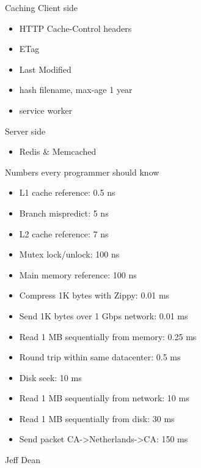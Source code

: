\documentclass{beamer}
\begin{document}
\begin{frame}{Caching}
  Client side
  \begin{itemize}
    \item HTTP Cache-Control headers
    \item ETag
    \item Last Modified
    \item hash filename, max-age 1 year
    \item service worker
  \end{itemize}
  Server side
  \begin{itemize}
    \item Redis \& Memcached
  \end{itemize}
\end{frame}

\begin{frame}{Numbers every programmer should know}
  \begin{itemize}
    \item L1 cache reference: 0.5 ns
    \item Branch mispredict: 5 ns
    \item L2 cache reference: 7 ns
    \item Mutex lock/unlock: 100 ns
    \item Main memory reference: 100 ns
    \item Compress 1K bytes with Zippy: 0.01 ms
    \item Send 1K bytes over 1 Gbps network: 0.01 ms
    \item Read 1 MB sequentially from memory: 0.25 ms
    \item Round trip within same datacenter: 0.5 ms
    \item Disk seek: 10 ms
    \item Read 1 MB sequentially from network: 10 ms
    \item Read 1 MB sequentially from disk: 30 ms
    \item Send packet CA->Netherlands->CA: 150 ms
  \end{itemize}
  Jeff Dean
\end{frame}
\end{document}
